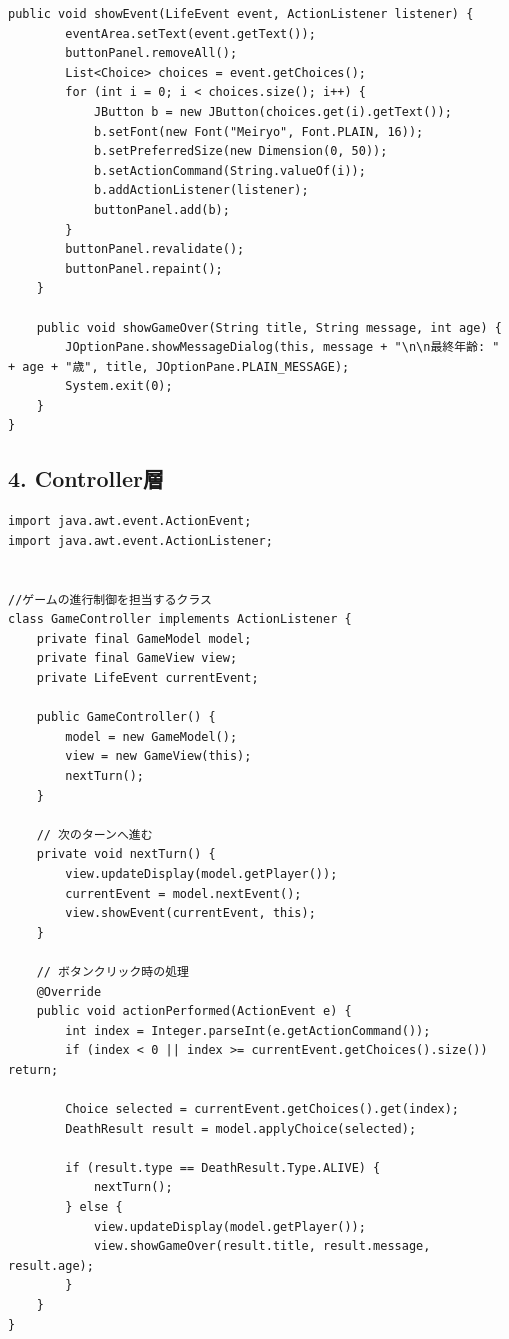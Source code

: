 \documentclass[a4paper,11pt]{jsarticle}
\begin{document}
\begin{lstlisting}[caption=GameView.java]
    public void showEvent(LifeEvent event, ActionListener listener) {
        eventArea.setText(event.getText());
        buttonPanel.removeAll();
        List<Choice> choices = event.getChoices();
        for (int i = 0; i < choices.size(); i++) {
            JButton b = new JButton(choices.get(i).getText());
            b.setFont(new Font("Meiryo", Font.PLAIN, 16));
            b.setPreferredSize(new Dimension(0, 50));
            b.setActionCommand(String.valueOf(i));
            b.addActionListener(listener);
            buttonPanel.add(b);
        }
        buttonPanel.revalidate();
        buttonPanel.repaint();
    }

    public void showGameOver(String title, String message, int age) {
        JOptionPane.showMessageDialog(this, message + "\n\n最終年齢: " + age + "歳", title, JOptionPane.PLAIN_MESSAGE);
        System.exit(0);
    }
}
\end{lstlisting}

\subsection*{4. Controller層}
\begin{lstlisting}[caption=GameController.java]
import java.awt.event.ActionEvent;
import java.awt.event.ActionListener;


//ゲームの進行制御を担当するクラス
class GameController implements ActionListener {
    private final GameModel model;
    private final GameView view;
    private LifeEvent currentEvent;

    public GameController() {
        model = new GameModel();
        view = new GameView(this);
        nextTurn();
    }

    // 次のターンへ進む
    private void nextTurn() {
        view.updateDisplay(model.getPlayer());
        currentEvent = model.nextEvent();
        view.showEvent(currentEvent, this);
    }

    // ボタンクリック時の処理
    @Override
    public void actionPerformed(ActionEvent e) {
        int index = Integer.parseInt(e.getActionCommand());
        if (index < 0 || index >= currentEvent.getChoices().size()) return;

        Choice selected = currentEvent.getChoices().get(index);
        DeathResult result = model.applyChoice(selected);

        if (result.type == DeathResult.Type.ALIVE) {
            nextTurn();
        } else {
            view.updateDisplay(model.getPlayer());
            view.showGameOver(result.title, result.message, result.age);
        }
    }
}
\end{lstlisting}
\end{document}
